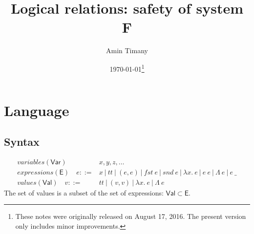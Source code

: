 \documentclass{article}
\title{Logical relations: safety of system F}
\author{Amin Timany}
\date{\today \footnote{These notes were originally released on August 17, 2016. The present version only includes minor improvements.}}
\newcommand{\gor}{~|~}
\newcommand{\fst}{\mathit{fst}}
\newcommand{\snd}{\mathit{snd}}
\newcommand{\TT}{\mathit{tt}}
\newcommand{\VAR}{\mathsf{Var}}
\newcommand{\EXP}{\mathsf{E}}
\newcommand{\VAL}{\mathsf{Val}}
\newcommand{\TArg}{\_}
\newcommand{\TLam}{\Lambda}
\newcommand{\expr}{e}
\newcommand{\val}{v}
\newcommand{\var}{x}
\newcommand{\varB}{y}
\newcommand{\varC}{z}
\begin{document}
\maketitle


\section{Language}
\subsection{Syntax}
\begin{align*}
\textit{variables} (\VAR) \hspace{1em} \phantom{\var ::={}}& \var, \varB, \varC, \dots\\
\textit{expressions} (\EXP) \hspace{1em} \expr ::={}& \var \gor \TT \gor (\expr, \expr)
\gor \fst~\expr \gor \snd~\expr \gor \lambda \var.~\expr \gor \expr~\expr
\gor \TLam~\expr \gor \expr~\TArg\\
\textit{values} (\VAL) \hspace{1em} \val ::={}& \TT \gor (\val, \val) \gor \lambda \var.~\expr
\gor \TLam~\expr
\end{align*}
The set of values is a subset of the set of expressions: $\VAL \subset \EXP$.
\end{document}
